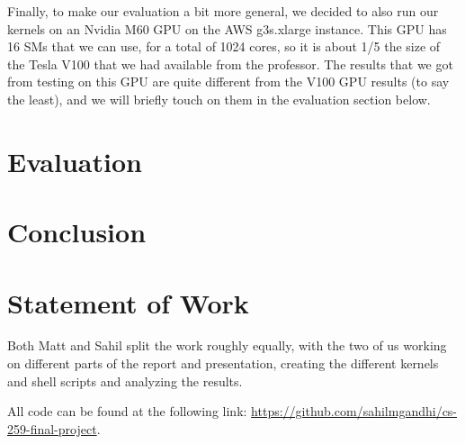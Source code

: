 \documentclass[sigconf]{acmart}
\begin{document}
Finally, to make our evaluation a bit more general, we decided to also run our kernels on an Nvidia M60 GPU on the AWS g3s.xlarge instance. This GPU has 16 SMs that we can use, for a total of 1024 cores, so it is about 1/5 the size of the Tesla V100 that we had available from the professor. The results that we got from testing on this GPU are quite different from the V100 GPU results (to say the least), and we will briefly touch on them in the evaluation section below. 

\section{Evaluation}

\section{Conclusion}

\section{Statement of Work}
Both Matt and Sahil split the work roughly equally, with the two of us working on different parts of the report and presentation, creating the different kernels and shell scripts and analyzing the results.

All code can be found at the following link: \url{https://github.com/sahilmgandhi/cs-259-final-project}.







\end{document}
